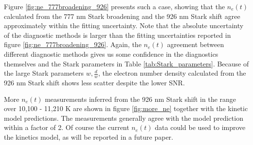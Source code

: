 \documentclass[12pt]{iopart}
\begin{document}
Figure \ref{fig:ne_777broadening_926} presents such a case, showing that the $n_e(t)$ calculated from the 777 nm Stark broadening and the 926 nm Stark shift agree approximately within the fitting uncertainty.  Note that the absolute uncertainty of the diagnostic methods is larger than the fitting uncertainties reported in figure \ref{fig:ne_777broadening_926}.  Again, the $n_e(t)$ agreement between different diagnostic methods gives us some confidence in the diagnostics themselves and the Stark parameters in Table \ref{tab:Stark_parameters}. Because of the large Stark parameters $w, \frac{d}{w}$, the electron number density calculated from the 926 nm Stark shift shows less scatter despite the lower SNR. 

More $n_e(t)$ measurements inferred from the 926 nm Stark shift in the range over 10,100 - 11,210 K are shown in figure \ref{fig:more_ne} together with the kinetic model predictions. The measurements generally agree with the model prediction within a factor of 2. Of course the current $n_e(t)$ data could be used to improve the kinetics model, as will be reported in a future paper.
\end{document}
